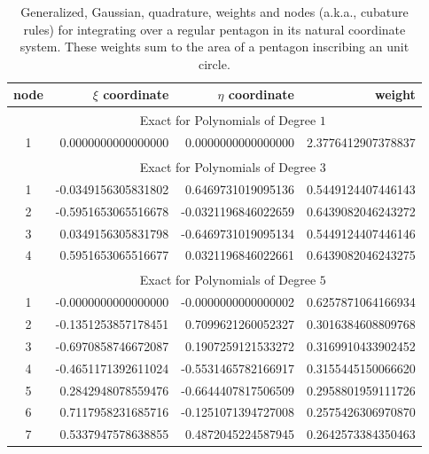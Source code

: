 \begin{table}
    \centering
    \begin{tabular}{|c|rrr|}
        \hline
        node & \centering $\xi$ coordinate \phantom{123}  & 
        $\eta$ coordinate \phantom{123} & weight \phantom{12345} \\ \hline
        & \multicolumn{3}{|c|}{Exact for Polynomials of Degree $1^{\phantom{|^|}}$} \\ \hline
        1 & 0.0000000000000000 & 0.0000000000000000 &
        2.3776412907378837\vphantom{$|^{|^|}$} \\ 
        \hline
        & \multicolumn{3}{|c|}{Exact for Polynomials of Degree $3^{\phantom{|^|}}$} \\ \hline
        1 & -0.0349156305831802 &  0.6469731019095136 &
        0.5449124407446143\vphantom{$|^{|^|}$} \\
        2 & -0.5951653065516678 & -0.0321196846022659 & 0.6439082046243272 \\
        3 &  0.0349156305831798 & -0.6469731019095134 & 0.5449124407446146 \\
        4 &  0.5951653065516677 &  0.0321196846022661 & 0.6439082046243275 \\ 
        \hline
        & \multicolumn{3}{|c|}{Exact for Polynomials of Degree $5^{\phantom{|^|}}$} \\ \hline
        1 & -0.0000000000000000 & -0.0000000000000002 &
        0.6257871064166934\vphantom{$|^{|^|}$} \\
        2 & -0.1351253857178451 &  0.7099621260052327 & 0.3016384608809768 \\
        3 & -0.6970858746672087 &  0.1907259121533272 & 0.3169910433902452 \\ 
        4 & -0.4651171392611024 & -0.5531465782166917 & 0.3155445150066620 \\
        5 &  0.2842948078559476 & -0.6644407817506509 & 0.2958801959111726 \\
        6 &  0.7117958231685716 & -0.1251071394727008 & 0.2575426306970870 \\
        7 &  0.5337947578638855 &  0.4872045224587945 & 0.2642573384350463 \\
        \hline
    \end{tabular}
    \caption{Generalized, Gaussian, quadrature, weights and nodes (a.k.a., cubature rules) for integrating over a regular pentagon in its natural coordinate system.  These weights sum to the area of a pentagon inscribing an unit circle.}
    \label{tabQuadrature}
\end{table}

